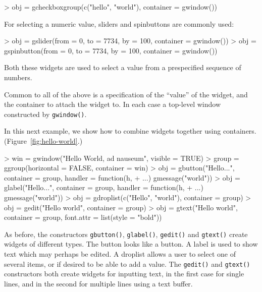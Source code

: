 \documentclass[12pt]{article}
\newcommand{\RFunc}[1]{\texttt{#1()}}
\begin{document}
\begin{Schunk}
\begin{Sinput}
> obj = gcheckboxgroup(c("hello", "world"), container = gwindow())
\end{Sinput}
\end{Schunk}



For selecting a numeric value, sliders and spinbuttons are commonly used:
\begin{Schunk}
\begin{Sinput}
> obj = gslider(from = 0, to = 7734, by = 100, container = gwindow())
> obj = gspinbutton(from = 0, to = 7734, by = 100, container = gwindow())
\end{Sinput}
\end{Schunk}
Both these widgets are used to select a value from a prespecified
sequence of numbers.


Common to all of the above is a specification of the ``value'' of the
widget, and the container to attach the widget to. In each case a
top-level window constructed by \RFunc{gwindow}.


In this next example, we show how to  combine widgets together using
containers. (Figure~\ref{fig:hello-world}.)


\begin{Schunk}
\begin{Sinput}
> win = gwindow("Hello World, ad nauseum", visible = TRUE)
> group = ggroup(horizontal = FALSE, container = win)
> obj = gbutton("Hello...", container = group, handler = function(h, 
+     ...) gmessage("world"))
> obj = glabel("Hello...", container = group, handler = function(h, 
+     ...) gmessage("world"))
> obj = gdroplist(c("Hello", "world"), container = group)
> obj = gedit("Hello world", container = group)
> obj = gtext("Hello world", container = group, font.attr = list(style = "bold"))
\end{Sinput}
\end{Schunk}


As before, the constructors \RFunc{gbutton}, \RFunc{glabel},
\RFunc{gedit} and \RFunc{gtext} create widgets of different types.
The button looks like a button. A label is used to show text which may
perhaps be edited. A droplist allows a user to select one of several
items, or if desired to be able to add a value. The \RFunc{gedit} and
\RFunc{gtext} constructors both create widgets for inputting text, in
the first case for single lines, and in the second for multiple lines
using a text buffer.
\end{document}
